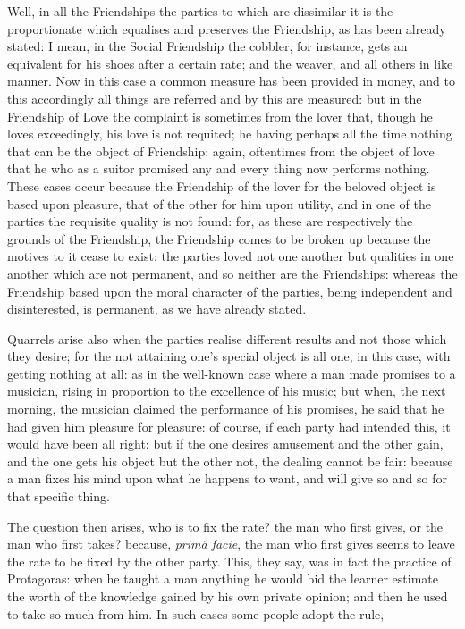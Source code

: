 Well, in all the Friendships the parties to which are dissimilar it is the
proportionate which equalises and preserves the Friendship, as has been already
stated: I mean, in the Social Friendship the cobbler, for instance, gets an
equivalent for his shoes after a certain rate; and the weaver, and all others
in like manner. Now in this case a common measure has been provided in money,
and to this accordingly all things are referred and by this are measured: but
in the Friendship of Love the complaint is sometimes from the lover that,
though he loves exceedingly, his love is not requited; he having perhaps all
the time nothing that can be the object of Friendship: again, oftentimes from
the object of love that he who as a suitor promised any and every thing now
performs nothing. These cases occur because the Friendship of the lover for the
beloved object is based upon pleasure, that of the other for him upon utility,
and in one of the parties the requisite quality is not found: for, as these are
respectively the grounds of the Friendship, the Friendship comes to be broken
up because the motives to it cease to exist: the parties loved not one another
but qualities in one another which are not permanent, and so neither are the
Friendships: whereas the Friendship based upon the moral character of the
parties, being independent and disinterested, is permanent, as we have already
stated.

Quarrels arise also when the parties realise different results and not those
which they desire; for the not attaining one’s special object is all one,
in this case, with getting nothing at all: as in the well-known case where a
man made promises to a musician, rising in proportion to the excellence of his
music; but when, the next morning, the musician claimed the performance of his
promises, he said that he had given him pleasure for pleasure: of course, if
each party had intended this, it would have been all right: but if the one
desires amusement and the other gain, and the one gets his object but the other
not, the dealing cannot be fair: because a man fixes his mind upon what he
happens to want, and will give so and so for that specific thing.

The question then arises, who is to fix the rate? the man who first gives, or
the man who first takes? because, \emph{primâ facie}, the man who first gives
seems to leave the rate to be fixed by the other party. This, they say, was in
fact the practice of Protagoras: when he taught a man anything he would bid the
learner estimate the worth of the knowledge gained by his own private opinion;
and then he used to take so much from him. In such cases some people adopt the
rule,

